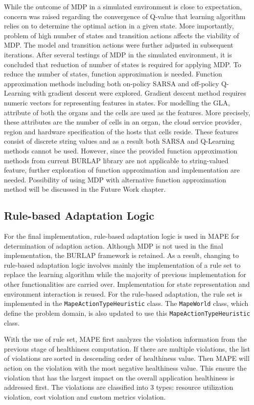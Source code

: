 \documentclass{seal_thesis}
\begin{document}
While the outcome of MDP in a simulated environment is close to expectation, concern was raised regarding the convergence of Q-value that learning algorithm relies on to determine the optimal action in a given state.
More importantly, problem of high number of states and transition actions affects the viability of MDP.
The model and transition actions were further adjusted in subsequent iterations.
After several testings of MDP in the simulated environment, it is concluded that reduction of number of states is required for applying MDP.
To reduce the number of states, function approximation is needed.
Function approximation methods including both on-policy SARSA and off-policy Q-Learning with gradient descent were explored.
Gradient descent method requires numeric vectors for representing features in states.
For modelling the GLA, attribute of both the organs and the cells are used as the features.
More precisely, these attributes are the number of cells in an organ, the cloud service provider, region and hardware specification of the hosts that cells reside.
These features consist of discrete string values and as a result both SARSA and Q-Learning methods cannot be used.
However, since the provided function approximation methods from current BURLAP library are not applicable to string-valued feature, further exploration of function approximation and implementation are needed.
Possibility of using MDP with alternative function approximation method will be discussed in the Future Work chapter.

\subsection{Rule-based Adaptation Logic}
For the final implementation, rule-based adaptation logic is used in MAPE for determination of adaption action. 
Although MDP is not used in the final implementation, the BURLAP framework is retained.
As a result, changing to rule-based adaptation logic involves mainly the implementation of a rule set to replace the learning algorithm while the majority of previous implementation for other functionalities are carried over.
Implementation for state representation and environment interaction is reused.
For the rule-based adaptation, the rule set is implemented in the \texttt{MapeActionTypeHeuristic} class.
The \texttt{MapeWorld} class, which define the problem domain, is also updated to use this \texttt{MapeActionTypeHeuristic} class.

With the use of rule set, MAPE first analyzes the violation information from the previous stage of healthiness computation.
If there are multiple violations, the list of violations are sorted in descending order of healthiness value.
Then MAPE will action on the violation with the most negative healthiness value.
This ensure the violation that has the largest impact on the overall application healthiness is addressed first.
The violations are classified into 3 types: resource utilization violation, cost violation and custom metrics violation.
\end{document}
